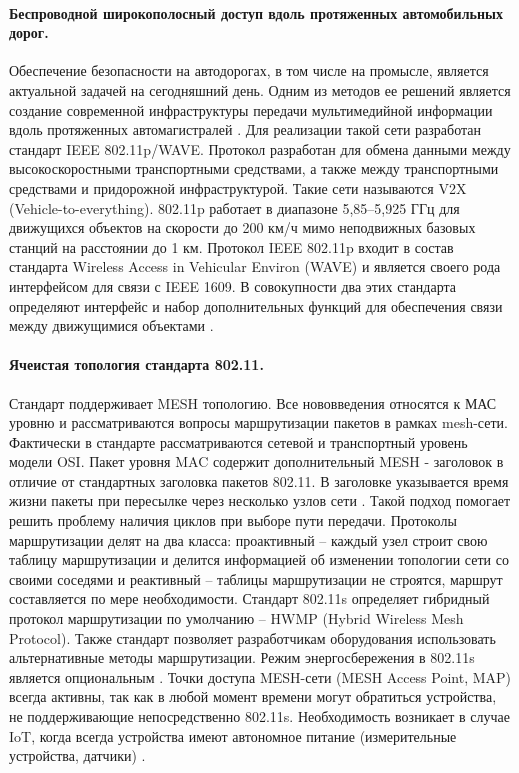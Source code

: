 \paragraph{Беспроводной широкополосный доступ вдоль протяженных автомобильных дорог.}
Обеспечение безопасности на автодорогах, в том числе на промысле, является  актуальной задачей на сегодняшний день. Одним из методов ее решений является создание современной инфраструктуры передачи мультимедийной информации вдоль протяженных автомагистралей \cite{Vish2015}. Для реализации такой сети разработан стандарт IEEE 802.11p/WAVE. Протокол разработан для обмена данными между высокоскоростными транспортными средствами, а также между транспортными средствами и придорожной инфраструктурой. Такие сети называются V2X (Vehicle-to-everything). 802.11p работает в диапазоне 5,85–5,925 ГГц для движущихся объектов на скорости до 200 км/ч мимо неподвижных базовых станций на расстоянии до 1 км. Протокол IEEE 802.11p входит в состав стандарта Wireless Access in Vehicular Environ (WAVE) и является своего рода интерфейсом для связи с IEEE 1609. В совокупности два этих стандарта определяют интерфейс и набор дополнительных функций для обеспечения связи между движущимися объектами \cite{IEEE802.11p}.

\paragraph{Ячеистая топология стандарта 802.11.} Стандарт поддерживает MESH топологию. Все нововведения относятся к МАС уровню и рассматриваются вопросы маршрутизации пакетов в рамках mesh-сети. Фактически в стандарте рассматриваются сетевой и транспортный уровень модели OSI. Пакет уровня MAC содержит дополнительный MESH - заголовок в отличие от стандартных заголовка пакетов 802.11. В заголовке указывается время жизни пакеты при пересылке через несколько узлов сети \cite{Vishnevsky2009}. Такой подход помогает решить проблему наличия циклов при выборе пути передачи. Протоколы маршрутизации делят на два класса: проактивный -- каждый узел строит свою таблицу маршрутизации и делится информацией об изменении топологии сети со своими соседями и реактивный --  таблицы маршрутизации не строятся, маршрут составляется по мере необходимости. Стандарт 802.11s определяет гибридный протокол маршрутизации по умолчанию -- HWMP (Hybrid Wireless Mesh Protocol). Также стандарт позволяет разработчикам оборудования использовать альтернативные методы маршрутизации. Режим энергосбережения в 802.11s является опциональным \cite{802.11WG-WirelessLANWorkingGroup2020}. Точки доступа MESH-сети (MESH Access Point, MAP) всегда активны, так как в любой момент времени могут обратиться устройства, не поддерживающие непосредственно 802.11s. Необходимость возникает в случае IoT, когда всегда устройства имеют автономное питание (измерительные устройства, датчики) \cite{Vishnevsky2009}.


